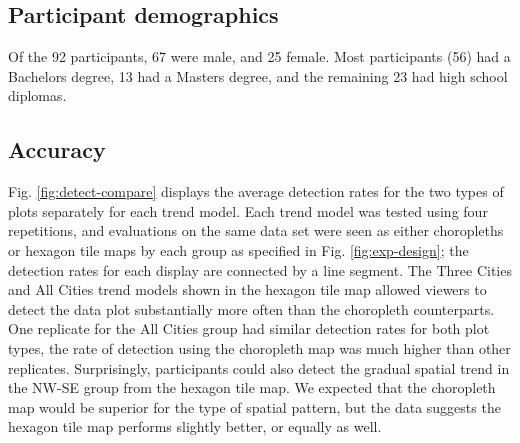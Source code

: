 \documentclass[journal]{vgtc}                     %
\begin{document}
\hypertarget{participant-demographics}{%
\subsection{Participant demographics}\label{participant-demographics}}

Of the 92 participants, 67 were male, and 25 female. Most participants (56) had a Bachelors degree, 13 had a Masters degree, and the remaining 23 had high school diplomas.

\hypertarget{accuracy}{%
\subsection{Accuracy}\label{accuracy}}

Fig. \ref{fig:detect-compare} displays the average detection rates for the two types of plots separately for each trend model. Each trend model was tested using four repetitions, and evaluations on the same data set were seen as either choropleths or hexagon tile maps by each group as specified in Fig. \ref{fig:exp-design}; the detection rates for each display are connected by a line segment. The Three Cities and All Cities trend models shown in the hexagon tile map allowed viewers to detect the data plot substantially more often than the choropleth counterparts. One replicate for the All Cities group had similar detection rates for both plot types, the rate of detection using the choropleth map was much higher than other replicates. Surprisingly, participants could also detect the gradual spatial trend in the NW-SE group from the hexagon tile map. We expected that the choropleth map would be superior for the type of spatial pattern, but the data suggests the hexagon tile map performs slightly better, or equally as well.
\end{document}
